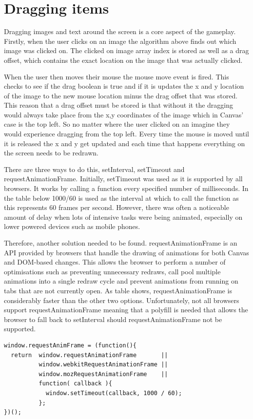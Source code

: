 \documentclass[12pt,a4paper]{report}
\begin{document}
\section{Dragging items}
Dragging images and text around the screen is a core aspect of the gameplay.
Firstly, when the user clicks on an image the algorithm above finds out which image was clicked on. The clicked on image array index is stored as well as a drag offset, which contains the exact location on the image that was actually clicked.

When the user then moves their mouse the mouse move event is fired. This checks to see if the drag boolean is true and if it is updates the x and y location of the image to the new mouse location minus the drag offset that was stored. This reason that a drag offset must be stored is that without it the dragging would always take place from the x,y coordinates of the image which in Canvas' case is the top left. So no matter where the user clicked on an imagine they would experience dragging from the top left. Every time the mouse is moved until it is released the x and y get updated and each time that happens everything on the screen needs to be redrawn. 

There are three ways to do this, setInterval, setTimeout and requestAnimationFrame. Initially, setTimeout was used as it is supported by all browsers. It works by calling a function every specified number of milliseconds. In the table below 1000/60 is used as the interval at which to call the function as this represents 60 frames per second. However, there was often a noticeable amount of delay when lots of intensive tasks were being animated, especially on lower powered devices such as mobile phones.

Therefore, another solution needed to be found. requestAnimationFrame is an API provided by browsers that handle the drawing of animations for both Canvas and DOM-based changes. This allows the browser to perform a number of optimisations such as preventing unnecessary redraws, call pool multiple animations into a single redraw cycle and prevent animations from running on tabs that are not currently open. As table shows, requestAnimationFrame is considerably faster than the other two options. Unfortunately, not all browsers support requestAnimationFrame meaning that a polyfill is needed that allows the browser to fall back to setInterval should requestAnimationFrame not be supported.

\begin{minipage}{\linewidth}
\begin{lstlisting}
window.requestAnimFrame = (function(){
  return  window.requestAnimationFrame       ||
          window.webkitRequestAnimationFrame ||
          window.mozRequestAnimationFrame    ||
          function( callback ){
            window.setTimeout(callback, 1000 / 60);
          };
})();
\end{lstlisting}
\end{minipage}
\end{document}

